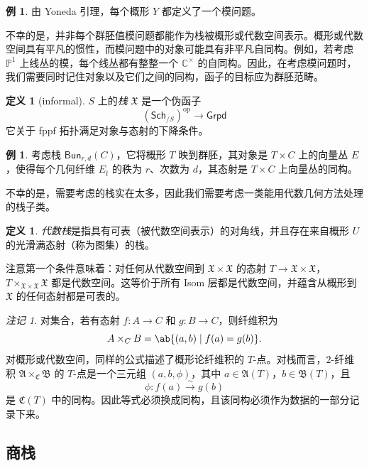 \documentclass{amsart}
\theoremstyle{definition}
\newtheorem{defn}[thm]{定义}
\newtheorem{exm}[thm]{例}
\theoremstyle{remark}
\newtheorem{rmk}[thm]{注记}
\theoremstyle{plain}
\theoremstyle{definition}
\theoremstyle{remark}
\newcommand{\C}{\mathbb{C}}
\renewcommand{\P}{\mathbb{P}}
\newcommand{\mf}[1]{\mathfrak{#1}}
\newcommand{\mr}[1]{\mathrm{#1}}
\newcommand{\ms}[1]{\mathsf{#1}}
\newcommand{\1}{\mathbf{1}}
\newcommand{\2}{\mathbf{2}}
\newcommand{\3}{\mathbf{3}}
\begin{document}
\begin{exm}
    由 Yoneda 引理，每个概形 \(Y\) 都定义了一个模问题。
\end{exm}

不幸的是，并非每个群胚值模问题都能作为栈被概形或代数空间表示。概形或代数空间具有平凡的惯性，而模问题中的对象可能具有非平凡自同构。例如，若考虑 \(\P^1\) 上线丛的模，每个线丛都有整整一个 \(\C^{\times}\) 的自同构。因此，在考虑模问题时，我们需要同时记住对象以及它们之间的同构，函子的目标应为群胚范畴。

\begin{defn}[informal]
    \(S\) 上的\textit{栈} \(\mf{X}\) 是一个伪函子
    \[ (\ms{Sch}_{/S})^{\mr{op}} \to \ms{Grpd} \]
    它关于 fppf 拓扑满足对象与态射的下降条件。
\end{defn}

\begin{exm}
    考虑栈 \(\ms{Bun}_{r,d}(C)\)，它将概形 \(T\) 映到群胚，其对象是 \(T\times C\) 上的向量丛 \(E\)，使得每个几何纤维 \(E_{\bar t}\) 的秩为 \(r\)、次数为 \(d\)，其态射是 \(T\times C\) 上向量丛的同构。
\end{exm}

不幸的是，需要考虑的栈实在太多，因此我们需要考虑一类能用代数几何方法处理的栈子类。

\begin{defn}
    \textit{代数栈}是指具有可表（被代数空间表示）的对角线，并且存在来自概形 \(U\) 的光滑满态射（称为图集）的栈。
\end{defn}

注意第一个条件意味着：对任何从代数空间到 \(\mf{X} \times \mf{X}\) 的态射 \(T \to \mf{X} \times \mf{X}\)，\(T \times_{\mf{X} \times \mf{X}} \mf{X}\) 都是代数空间。这等价于所有 Isom 层都是代数空间，并蕴含从概形到 \(\mf{X}\) 的任何态射都是可表的。

\begin{rmk}
    对集合，若有态射 \(f\colon A\to C\) 和 \(g\colon B\to C\)，则纤维积为
    \[ 
        A\times_C B=\ab\{(a,b)\mid f(a)=g(b)\}. 
    \] 
    对概形或代数空间，同样的公式描述了概形论纤维积的 \(T\)-点。对栈而言，\(2\)-纤维积 \(\mf{A}\times_{\mf{C}}\mf{B}\) 的 \(T\)-点是一个三元组 \((a,b,\phi)\)，其中 \(a\in\mf{A}(T)\)，\(b\in\mf{B}(T)\)，且
    \[ 
        \phi\colon f(a)\xrightarrow{\sim}g(b) 
    \]
    是 \(\mf{C}(T)\) 中的同构。因此等式必须换成同构，且该同构必须作为数据的一部分记录下来。
\end{rmk}


\subsection{商栈}%
\label{sub:Quotient stacks}
\end{document}
